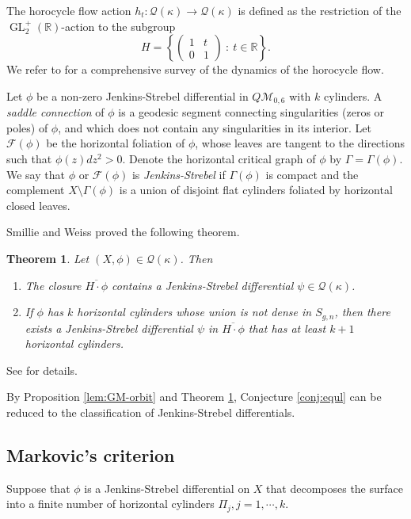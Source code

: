 \documentclass[11pt]{amsart}
\theoremstyle{plain}
\newtheorem{Theorem}{Theorem}[section]
\begin{document}
The horocycle flow action $h_t : \mathcal{Q}(\kappa) \rightarrow \mathcal{Q}(\kappa)$ 
is defined  as the restriction of the $\operatorname{GL}_2^+(\mathbb{R})$-action to the subgroup
$$H=\left\{\begin{pmatrix}
    1 & t\\
    0 & 1
\end{pmatrix} \ : \  t\in \mathbb{R} \right\}.$$
We refer to \cite{CW2022} for a comprehensive survey of the dynamics of
 the horocycle flow.

Let $\phi$ be a non-zero Jenkins-Strebel differential  in $Q\mathcal{M}_{0,6}$ with $k$ cylinders. A \emph{saddle connection} of $\phi$ is a geodesic segment connecting singularities (zeros or poles) of $\phi$, and
which does not contain any singularities in its interior. 
Let $\mathcal{F}(\phi)$ be the horizontal foliation
 of $\phi$, whose leaves are tangent to the directions  such that $\phi(z)dz^2>0$.   Denote the horizontal critical graph of $\phi$
by $\Gamma=\Gamma(\phi)$. 
We say that  $\phi$ or $\mathcal{F}(\phi)$ is \emph{Jenkins-Strebel}  if $\Gamma(\phi)$ is compact and the complement $X\setminus \Gamma(\phi)$  is a union of disjoint flat cylinders foliated by horizontal closed leaves. 


Smillie and Weiss \cite[Theorem 5]{SW2004} proved the following theorem. 

\begin{Theorem}\label{thm:SW}
Let $(X,\phi) \in \mathcal{Q}(\kappa)$. Then
\begin{enumerate}
  \item The  closure $\overline{H \cdot \phi}$ contains a Jenkins-Strebel differential $\psi\in  \mathcal{Q}(\kappa)$. 
  \item If $\phi$ has $k$ horizontal cylinders whose union is not dense in $S_{g,n}$,
  then there exists a Jenkins-Strebel differential $\psi$ in $\overline{H \cdot \phi}$ that has at least $k+1$ horizontal cylinders. 
\end{enumerate}   
\end{Theorem}
See \cite[\S 2.4]{GM2020} for details.

By Proposition \ref{lem:GM-orbit} and Theorem \ref{thm:SW}, Conjecture \ref{conj:equl}
can be reduced to the classification of Jenkins-Strebel differentials. 


\subsection{Markovic's criterion } 
Suppose that $\phi$ is a Jenkins-Strebel differential on $X$ that decomposes the surface into a finite number of horizontal cylinders $\Pi_{j}, j=1,\cdots,k$. 
\end{document}
